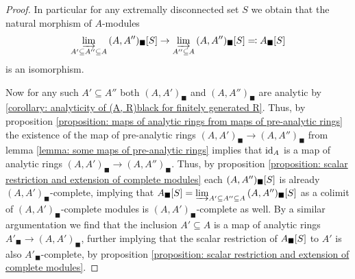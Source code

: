 \begin{proof}
	In particular for any extremally disconnected set $S$ we obtain that the natural morphism of $A$-modules
	$$\varinjlim_{A'\subseteq A''\subseteq A} {(A, A'')_\blacksquare[S]} \to \varinjlim_{A''\subseteq A} {(A, A'')_\blacksquare[S]} \eqqcolon {A_\blacksquare[S]}$$
	is an isomorphism. 
	
	Now for any such $A'\subseteq A''$ both $(A, A')_\blacksquare$ and $(A, A'')_\blacksquare$ are analytic by \ref{corollary: analyticity of (A, R)black for finitely generated R}. Thus, by proposition \ref{proposition: maps of analytic rings from maps of pre-analytic rings} the existence of the map of pre-analytic rings $(A, A')_\blacksquare \to (A, A'')_\blacksquare$ from lemma \ref{lemma: some maps of pre-analytic rings} implies that $\mathrm{id}_A$ is a map of analytic rings $(A, A')_\blacksquare \to (A, A'')_\blacksquare$. Thus, by proposition \ref{proposition: scalar restriction and extension of complete modules} each ${(A, A'')_\blacksquare[S]}$ is already $(A, A')_\blacksquare$-complete, implying that ${A_\blacksquare[S]} = \varinjlim_{A'\subseteq A'' \subseteq A} {(A, A'')_\blacksquare[S]}$ as a colimit of $(A, A')_\blacksquare$-complete modules is $(A, A')_\blacksquare$-complete as well. By a similar argumentation we find that the inclusion $A'\subseteq A$ is a map of analytic rings $A'_\blacksquare \to (A, A')_\blacksquare$, further implying that the scalar restriction of ${A_\blacksquare[S]}$ to $A'$ is also $A'_\blacksquare$-complete, by proposition \ref{proposition: scalar restriction and extension of complete modules}.
	

\end{proof}
